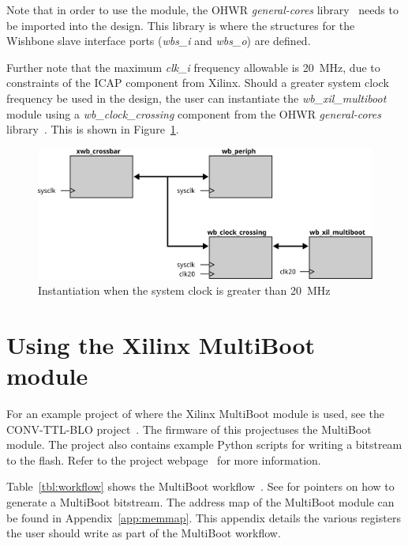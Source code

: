 \documentclass[a4paper,11pt]{article}
\begin{document}
Note that in order to use the module, the OHWR \textit{general-cores}
library~\cite{gencores-ohwr} needs to be imported into the design. This library is where
the structures for the Wishbone slave interface ports (\textit{wbs\_i} and \textit{wbs\_o})
are defined.

Further note that the maximum \textit{clk\_i} frequency allowable is 20~MHz, due
to constraints of the ICAP component from Xilinx. Should a greater system clock
frequency be used in the design, the user can instantiate the \textit{wb\_xil\_multiboot}
module using a \textit{wb\_clock\_crossing} component from the OHWR \textit{general-cores}
library~\cite{gencores-ohwr}. This is shown in Figure~\ref{fig:inst-clkcross}.

\begin{figure}
  \centerline{\includegraphics[width=\textwidth]{fig/inst-clkcross}}
  \caption{Instantiation when the system clock is greater than 20~MHz}
  \label{fig:inst-clkcross}
\end{figure}

\pagebreak
\section{Using the Xilinx MultiBoot module}
\label{sec:instantiation}

For an example project of where the Xilinx MultiBoot module is used, see the
CONV-TTL-BLO project~\cite{ctb-proj}. The firmware of this projectuses the MultiBoot
module. The project also contains example Python scripts for writing a bitstream to
the flash. Refer to the project webpage~\cite{ctb-proj} for more information.

Table~\ref{tbl:workflow} shows the MultiBoot workflow~\cite{xtp059}. See \cite{gen-bitstream}
for pointers on how to generate a MultiBoot bitstream. The address map of the MultiBoot module
can be found in Appendix~\ref{app:memmap}. This appendix details the various registers the
user should write as part of the MultiBoot workflow.
\end{document}
